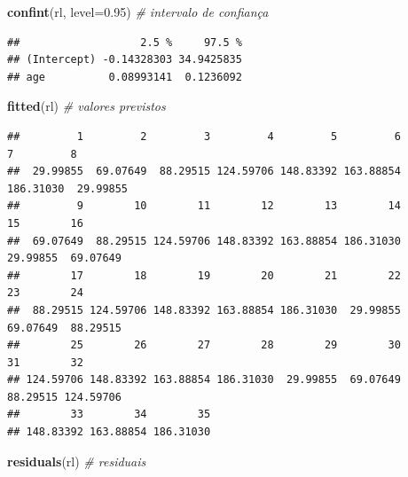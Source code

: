 \documentclass[
]{book}
\newenvironment{Shaded}{\begin{snugshade}}{\end{snugshade}}
\newcommand{\CommentTok}[1]{\textcolor[rgb]{0.56,0.35,0.01}{\textit{#1}}}
\newcommand{\DataTypeTok}[1]{\textcolor[rgb]{0.13,0.29,0.53}{#1}}
\newcommand{\FloatTok}[1]{\textcolor[rgb]{0.00,0.00,0.81}{#1}}
\newcommand{\KeywordTok}[1]{\textcolor[rgb]{0.13,0.29,0.53}{\textbf{#1}}}
\newcommand{\NormalTok}[1]{#1}
\begin{document}
\begin{Shaded}
\begin{Highlighting}[]
\KeywordTok{confint}\NormalTok{(rl, }\DataTypeTok{level=}\FloatTok{0.95}\NormalTok{) }\CommentTok{# intervalo de confiança}
\end{Highlighting}
\end{Shaded}

\begin{verbatim}
##                   2.5 %     97.5 %
## (Intercept) -0.14328303 34.9425835
## age          0.08993141  0.1236092
\end{verbatim}

\begin{Shaded}
\begin{Highlighting}[]
\KeywordTok{fitted}\NormalTok{(rl) }\CommentTok{# valores previstos}
\end{Highlighting}
\end{Shaded}

\begin{verbatim}
##         1         2         3         4         5         6         7         8 
##  29.99855  69.07649  88.29515 124.59706 148.83392 163.88854 186.31030  29.99855 
##         9        10        11        12        13        14        15        16 
##  69.07649  88.29515 124.59706 148.83392 163.88854 186.31030  29.99855  69.07649 
##        17        18        19        20        21        22        23        24 
##  88.29515 124.59706 148.83392 163.88854 186.31030  29.99855  69.07649  88.29515 
##        25        26        27        28        29        30        31        32 
## 124.59706 148.83392 163.88854 186.31030  29.99855  69.07649  88.29515 124.59706 
##        33        34        35 
## 148.83392 163.88854 186.31030
\end{verbatim}

\begin{Shaded}
\begin{Highlighting}[]
\KeywordTok{residuals}\NormalTok{(rl) }\CommentTok{# residuais}
\end{Highlighting}
\end{Shaded}
\end{document}
